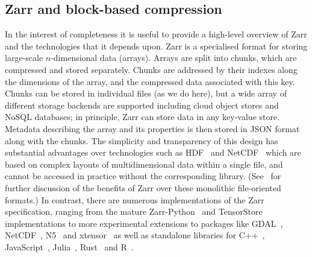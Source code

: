 \documentclass[a4paper,num-refs]{oup-contemporary}
\begin{document}
\subsection{Zarr and block-based compression}
In the interest of completeness it is useful to provide a high-level overview
of Zarr and the technologies that it depends upon. Zarr is a specialised format
for storing large-scale $n$-dimensional data (arrays). Arrays
are split into chunks, which are compressed and stored separately. Chunks are 
addressed by their indexes along the dimensions of the array, and the 
compressed data associated with this key. Chunks can
be stored in individual files (as we do here), but a wide array of different
storage backends are supported including cloud object stores 
and NoSQL databases;
in principle, Zarr can store data in any key-value store.
Metadata describing the array and its properties is then stored 
in JSON format along with the chunks. 
The simplicity and transparency
of this design has substantial advantages over technologies
such as HDF~\citep{folk2011overview} and 
NetCDF~\citep{rew1990netcdf} which are based on complex
layouts of multidimensional data within a single file,
and cannot be accessed in practice without the corresponding library.
(See~\cite{abernathey2021cloud} for further discussion of the benefits
of Zarr over these monolithic file-oriented formats.)
In contrast, there are numerous implementations 
of the Zarr specification, ranging 
from the mature Zarr-Python~\citep{zarrpython}
and TensorStore~\citep{tensorstore} implementations
to more experimental extensions to packages like
GDAL~\citep{gdal_zarr},
NetCDF~\citep{netcfd_c},
N5~\citep{n5zarr}
and xtensor~\citep{xtensor_zarr}
as well as  standalone libraries for 
C++~\citep{ruan2024image}, JavaScript~\cite{zarrjs},
Julia~\cite{zarrjl}, Rust~\citep{zarrs}
and R~\cite{pizzarr}.
\end{document}
